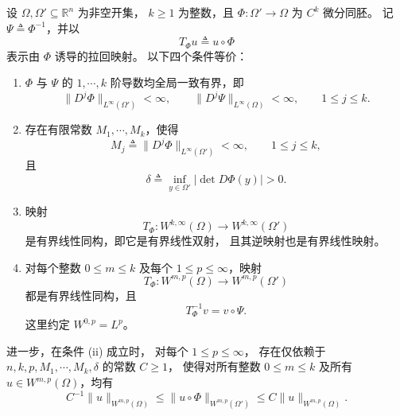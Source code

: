 \documentclass[../../main.tex]{subfiles}%
\begin{document}
\begin{theorem}
\label{theorem:一般微分同胚Wkp等价}
设 $\Omega,\Omega'\subseteq\mathbb{R}^n$ 为非空开集，
$k\geqslant 1$ 为整数，且
$\Phi:\Omega'\to\Omega$ 为 $C^k$ 微分同胚。
记 $\Psi\triangleq\Phi^{-1}$，并以
\[
T_\Phi u\triangleq u\circ\Phi
\]
表示由 $\Phi$ 诱导的拉回映射。
以下四个条件等价：
\begin{enumerate}
\item[(i)]
$\Phi$ 与 $\Psi$ 的 $1,\cdots,k$ 阶导数均全局一致有界，即
\[
\|D^j\Phi\|_{L^\infty(\Omega')}<\infty,
\qquad
\|D^j\Psi\|_{L^\infty(\Omega)}<\infty,
\qquad 1\leqslant j\leqslant k.
\]

\item[(ii)]
存在有限常数 $M_1,\cdots,M_k$，使得
\[
M_j\triangleq
\|D^j\Phi\|_{L^\infty(\Omega')}<\infty,
\qquad 1\leqslant j\leqslant k,
\]
且
\[
\delta\triangleq
\inf_{y\in\Omega'}|\det D\Phi(y)|>0.
\]

\item[(iii)]
映射
\[
T_\Phi:
W^{k,\infty}(\Omega)\longrightarrow W^{k,\infty}(\Omega')
\]
是有界线性同构，即它是有界线性双射，
且其逆映射也是有界线性映射。

\item[(iv)]
对每个整数 $0\leqslant m\leqslant k$ 及每个
$1\leqslant p\leqslant\infty$，映射
\[
T_\Phi:
W^{m,p}(\Omega)\longrightarrow W^{m,p}(\Omega')
\]
都是有界线性同构，且
\[
T_\Phi^{-1}v=v\circ\Psi.
\]
这里约定 $W^{0,p}=L^p$。
\end{enumerate}

进一步，在条件 \textup{(ii)} 成立时，
对每个 $1\leqslant p\leqslant\infty$，
存在仅依赖于
$n,k,p,M_1,\cdots,M_k,\delta$ 的常数 $C\geqslant 1$，
使得对所有整数 $0\leqslant m\leqslant k$
及所有 $u\in W^{m,p}(\Omega)$，均有
\[
C^{-1}\|u\|_{W^{m,p}(\Omega)}
\leqslant
\|u\circ\Phi\|_{W^{m,p}(\Omega')}
\leqslant
C\|u\|_{W^{m,p}(\Omega)}.
\]
\end{theorem}
\end{document}
